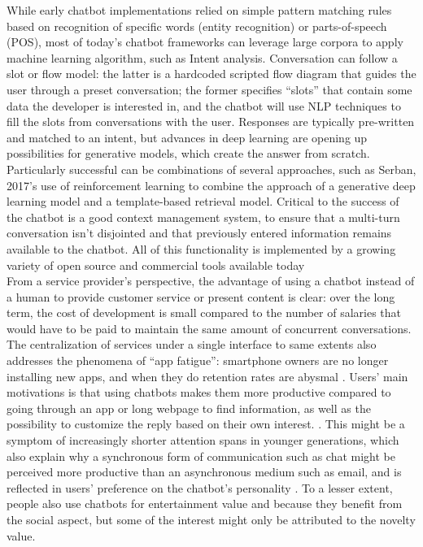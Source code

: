While early chatbot implementations relied on simple pattern matching rules based on recognition of specific words (entity recognition) or parts-of-speech (POS), most of today's chatbot frameworks can leverage large corpora to apply machine learning algorithm, such as Intent analysis. Conversation can follow a slot or flow model: the latter is a hardcoded scripted flow diagram that guides the user through a preset conversation; the former specifies ``slots'' that contain some data the developer is interested in, and the chatbot will use NLP techniques to fill the slots from conversations with the user. Responses are typically pre-written and matched to an intent, but advances in deep learning are opening up possibilities for generative models, which create the answer from scratch\cite{Gregori}. Particularly successful can be combinations of several approaches, such as Serban, 2017's use of reinforcement learning to combine the approach of a generative deep learning model and a template-based retrieval model\cite{Serban2017}. Critical to the success of the chatbot is a good context management system, to ensure that a multi-turn conversation isn't disjointed and that previously entered information remains available to the chatbot. All of this functionality is implemented by a growing variety of open source and commercial tools available today \cite{JavierCouto}\\
From a service provider's perspective, the advantage of using a chatbot instead of a human to provide customer service or present content is clear: over the long term, the cost of development is small compared to the number of salaries that would have to be paid to maintain the same amount of concurrent conversations. The centralization of services under a single interface to same extents also addresses the phenomena of ``app fatigue'': smartphone owners are no longer installing new apps, and when they do retention rates are abysmal \cite{appfatigue}. Users' main motivations is that using chatbots makes them more productive compared to going through an app or long webpage to find information, as well as the possibility to customize the reply based on their own interest. \cite{10.1007/978-3-319-70284-1_30}. This might be a symptom of increasingly shorter attention spans in younger generations\cite{Wilmer2017}, which also explain why a synchronous form of communication such as chat might be perceived more productive than an asynchronous medium such as email, and is reflected in users' preference on the chatbot's personality \cite{10.1007/978-3-319-67744-6_28}. To a lesser extent, people also use chatbots for entertainment value and because they benefit from the social aspect, but some of the interest might only be attributed to the novelty value. \\
